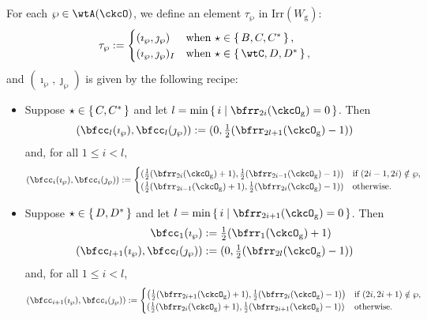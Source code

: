 \documentclass[12pt,a4paper]{amsart}
\numberwithin{equation}{section}
\theoremstyle{remark}
\def\half{{\tfrac{1}{2}}}
\def\Irr{\mathrm{Irr}}
\def\Wg{W_{\mathrm g}}
\def\imathp{\imath_{\wp}}
\def\jmathp{\jmath_{\wp}}
\begin{document}
  For each $\wp\in \wtA(\ckcO)$, we define an element $\tau_{\wp}$ in
  $\Irr(\Wg)$: 
  \begin{equation}\label{eq:tauwp}
    \tau_{\wp} :=
    \begin{cases}
      (\imathp,\jmathp) & \text{when } \star \in \set{B,C, C^{*} }, \\
      (\imathp,\jmathp)_{I} & \text{when } \star \in \set{\wtC,D,D^{*}},
    \end{cases}
  \end{equation}
  and $(\imathp, \jmathp)$ is given by the following recipe:
  \begin{itemize}
    \item Suppose $\star\in \set{C,C^{*}}$ and let
          $l=\min\set{i| \bfrr_{2i}(\ckcO_{\mathrm g})=0}$. Then
          \[
          (\bfcc_{l}(\imathp), \bfcc_{l}(\jmathp)) := (0,\half(\bfrr_{2l+1}(\ckcO_{\mathrm g})-1))
          \]
          and, for all $1\leq i< l$,
          \[
          (\bfcc_{i}(\imathp), \bfcc_{i}(\jmathp)):=
          \begin{cases}
            (\half (\bfrr_{2i}(\ckcO_{\mathrm g})+1), \half (\bfrr_{2i-1}(\ckcO_{\mathrm g})-1))
            & \text{if } (2i-1,2i)\notin \wp,\\
            (\half (\bfrr_{2i-1}(\ckcO_{\mathrm g})+1),\half (\bfrr_{2i}(\ckcO_{\mathrm g})-1)) & \text{otherwise.}
          \end{cases}
          \]
    \item Suppose $\star\in \set{D,D^{*}}$ and let
          $l=\min\set{i| \bfrr_{2i+1}(\ckcO_{\mathrm g})=0}$. Then
          \[
          \begin{split}
            \bfcc_{1}(\imathp) &:=
            \half(\bfrr_{1}(\ckcO_{\mathrm g})+1)\\
            (\bfcc_{l+1}(\imathp), \bfcc_{l}(\jmathp)) &:= (0,\half(\bfrr_{2l}(\ckcO_{\mathrm g})-1))
          \end{split}
          \]
          and, for all $1\leq i<l$,
          \[
          (\bfcc_{i+1}(\imathp), \bfcc_{i}(\jmathp)):=
          \begin{cases}
            \left(\half (\bfrr_{2i+1}(\ckcO_{\mathrm g})+1), \half (\bfrr_{2i}(\ckcO_{\mathrm g})-1)\right)
            & \text{if } (2i,2i+1)\notin \wp,\\
            (\half (\bfrr_{2i}(\ckcO_{\mathrm g})+1),\half (\bfrr_{2i+1}(\ckcO_{\mathrm g})-1)) & \text{otherwise.}
          \end{cases}
          \]

\end{itemize}
\end{document}

